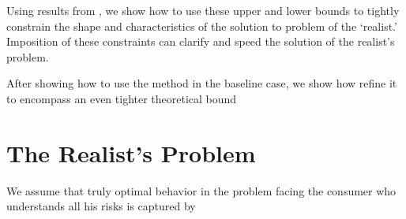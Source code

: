 \documentclass[titlepage, headings=optiontotocandhead]{econtex}
\begin{document}
Using results from \cite{BufferStockTheory}, we show how to use these upper and lower bounds to tightly constrain the shape and characteristics of the solution to problem of the `realist.'  Imposition of these constraints can clarify and speed the solution of the realist's problem.

After showing how to use the method in the baseline case, we show how refine it to encompass an even tighter theoretical bound

\hypertarget{the-realists-problem}{}
\section{The Realist's Problem}

We assume that truly optimal behavior in the problem facing the consumer who understands all his risks is captured by

\notinsubfile{} 
\end{document}
